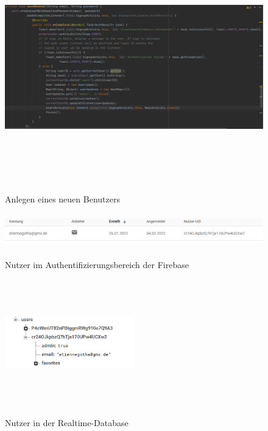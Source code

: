\documentclass[12pt, a4paper, oneside]{article}
\begin{document}
\begin{figure}
\includegraphics[width=1\textwidth, height=10cm]{save_user.png}
\centering
\label{new_user}
\caption{Anlegen eines neuen Benutzers}
\end{figure}
\begin{figure}
\includegraphics[width=1\textwidth, height=1.5cm]{User_In_Auth.png}
\centering
\label{auth_user}
\caption{Nutzer im Authentifizierungsbereich der Firebase}
\end{figure}
\begin{figure}
\includegraphics[width=0.5\textwidth, height=5.5cm]{User_Rtdb.png}
\centering
\label{user_rtdb}
\caption{Nutzer in der Realtime-Database}
\end{figure}
\end{document}
